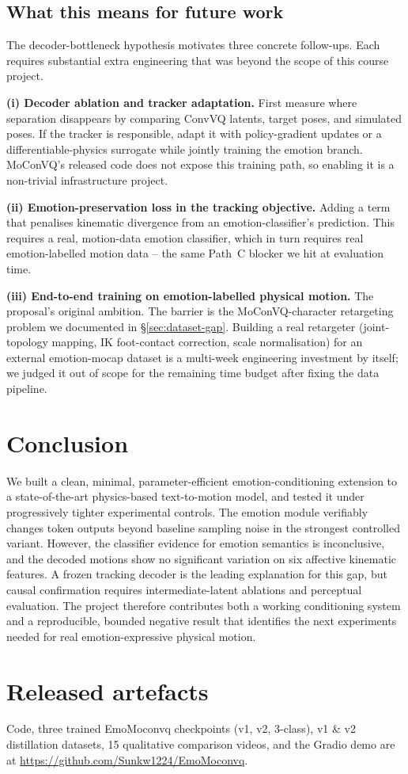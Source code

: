 \documentclass[conference]{IEEEtran}
\begin{document}
\subsection{What this means for future work}
The decoder-bottleneck hypothesis motivates three concrete
follow-ups. Each requires substantial extra engineering that was beyond
the scope of this course project.

\textbf{(i) Decoder ablation and tracker adaptation.} First measure where
separation disappears by comparing ConvVQ latents, target poses, and simulated
poses. If the tracker is responsible, adapt it with policy-gradient updates or
a differentiable-physics surrogate while jointly training the emotion branch.
MoConVQ's released code does not expose this training path, so enabling it is
a non-trivial infrastructure project.

\textbf{(ii) Emotion-preservation loss in the tracking objective.}
Adding a term that penalises kinematic divergence from an
emotion-classifier's prediction. This requires a real, motion-data
emotion classifier, which in turn requires real emotion-labelled motion
data -- the same Path~C blocker we hit at evaluation time.

\textbf{(iii) End-to-end training on emotion-labelled physical motion.}
The proposal's original ambition. The barrier is the
MoConVQ-character retargeting problem we documented in
\S\ref{sec:dataset-gap}. Building a real retargeter (joint-topology
mapping, IK foot-contact correction, scale normalisation) for an
external emotion-mocap dataset is a multi-week engineering investment by
itself; we judged it out of scope for the remaining time budget after
fixing the data pipeline.

\section{Conclusion}
We built a clean, minimal, parameter-efficient emotion-conditioning
extension to a state-of-the-art physics-based text-to-motion model, and
tested it under progressively tighter experimental controls. The
emotion module verifiably changes token outputs beyond baseline sampling
noise in the strongest controlled variant. However, the classifier evidence
for emotion semantics is inconclusive, and the decoded motions show no
significant variation on six affective kinematic features. A frozen tracking
decoder is the leading explanation for this gap, but causal confirmation
requires intermediate-latent ablations and perceptual evaluation. The project
therefore contributes both a working conditioning system and a reproducible,
bounded negative result that identifies the next experiments needed for real
emotion-expressive physical motion.

\section*{Released artefacts}
Code, three trained EmoMoconvq checkpoints (v1, v2, 3-class), v1 \& v2
distillation datasets, 15 qualitative comparison videos, and the Gradio
demo are at
\url{https://github.com/Sunkw1224/EmoMoconvq}.



\end{document}
